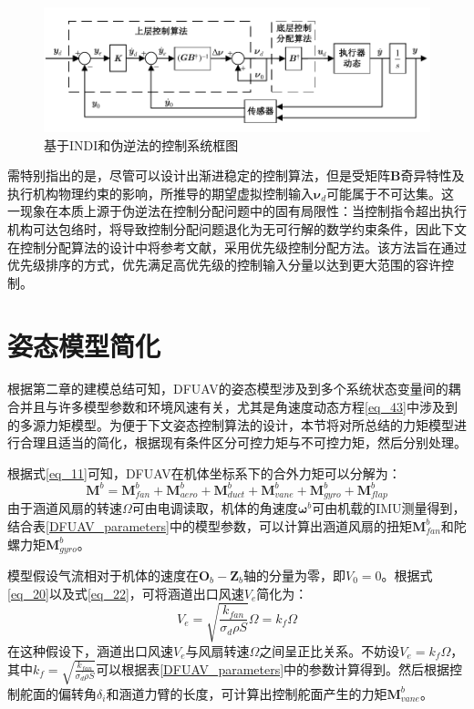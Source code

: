\begin{figure}[htbp]
	\centering
	\begin{minipage}[c]{1\textwidth}
		\centering
		\includegraphics[scale=1]{Fig/理论框图.pdf}
		\caption{\label{理论框图}基于INDI和伪逆法的控制系统框图}
	\end{minipage}%
\end{figure}

需特别指出的是，尽管可以设计出渐进稳定的控制算法，但是受矩阵$\boldsymbol{B}$奇异特性及执行机构物理约束的影响，所推导的期望虚拟控制输入$\boldsymbol{\nu}_d$可能属于不可达集。这一现象在本质上源于伪逆法在控制分配问题中的固有局限性：当控制指令超出执行机构可达包络时，将导致控制分配问题退化为无可行解的数学约束条件，因此下文在控制分配算法的设计中将参考文献\parencite{HKXB202010026}，采用优先级控制分配方法。该方法旨在通过优先级排序的方式，优先满足高优先级的控制输入分量以达到更大范围的容许控制。

\section{姿态模型简化}

根据第二章的建模总结可知，DFUAV的姿态模型涉及到多个系统状态变量间的耦合并且与许多模型参数和环境风速有关，尤其是角速度动态方程\eqref{eq_43}中涉及到的多源力矩模型。为便于下文姿态控制算法的设计，本节将对所总结的力矩模型进行合理且适当的简化，根据现有条件区分可控力矩与不可控力矩，然后分别处理。

根据式\ref{eq_11}可知，DFUAV在机体坐标系下的合外力矩可以分解为：
\begin{equation}
    \boldsymbol{M}^b=\boldsymbol{M}_{fan}^b+\boldsymbol{M}_{aero}^b+\boldsymbol{M}_{duct}^b+\boldsymbol{M}_{vane}^b+\boldsymbol{M}_{gyro}^b+\boldsymbol{M}_{flap}^b
    \label{3-13}
\end{equation}
由于涵道风扇的转速$\Omega$可由电调读取，机体的角速度$\boldsymbol\omega^b$可由机载的IMU测量得到，结合表\ref{DFUAV_parameters}中的模型参数，可以计算出涵道风扇的扭矩$\boldsymbol{M}_{fan}^b$和陀螺力矩$\boldsymbol{M}_{gyro}^b$。

模型假设气流相对于机体的速度在$\boldsymbol{O}_b-\boldsymbol{Z}_b$轴的分量为零，即$V_0=0$。根据式\ref{eq_20}以及式\ref{eq_22}，可将涵道出口风速$V_{e}$简化为：
\begin{equation}
    V_e=\sqrt{\frac{k_{fan}}{\sigma_d\rho S}}\Omega={k_{f}}\Omega    \label{3-14}
\end{equation}
在这种假设下，涵道出口风速$V_{e}$与风扇转速$\Omega$之间呈正比关系。不妨设$V_e=k_{f}\Omega$，其中$k_{f}=\sqrt{\frac{k_{fan}}{\sigma_d\rho S}}$可以根据表\ref{DFUAV_parameters}中的参数计算得到。然后根据控制舵面的偏转角$\delta_{i}$和涵道力臂的长度，可计算出控制舵面产生的力矩$\boldsymbol{M}_{vane}^b$。

